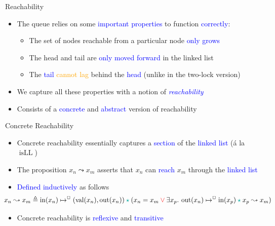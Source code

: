 \documentclass[9pt,xcolor={dvipsnames}]{beamer}
\newcommand{\isLL}{\operatorname{isLL}}
\newcommand{\nIn}[1]{\operatorname{in}(#1)}
\newcommand{\nVal}[1]{\operatorname{val}(#1)}
\newcommand{\nOut}[1]{\operatorname{out}(#1)}
\newcommand{\node}{x}
\newcommand{\nodeM}[1]{\node_{#1}}
\newcommand{\isNode}[1]{\nIn{#1} \mapsto^{\persistently} (\nVal{#1}, \nOut{#1})}
\newcommand{\reach}[2]{#1 \leadsto #2}
\let\oldlor\lor
\renewcommand{\lor}{\begingroup \color{red} \oldlor \endgroup}
\let\oldstar\star
\renewcommand{\star}{\begingroup \color{Emerald} \oldstar \endgroup}
\begin{document}
\begin{frame}{Reachability}
  \begin{itemize}
    \item The queue relies on some \textcolor{blue}{important properties} to function \textcolor{blue}{correctly}:
      \begin{itemize}
        \item The set of nodes reachable from a particular node \textcolor{blue}{only grows}
        \item The head and tail are \textcolor{blue}{only moved forward} in the linked list
        \item The \textcolor{blue}{tail} \textcolor{orange}{cannot lag} behind the \textcolor{blue}{head} (unlike in the two-lock version)
      \end{itemize}
    \item We capture all these properties with a notion of \textcolor{blue}{\textit{reachability}}
    \item Consists of a \textcolor{blue}{concrete} and \textcolor{blue}{abstract} version of reachability
  \end{itemize}
  \begin{block}{Concrete Reachability}
    \begin{itemize}
      \item Concrete reachability essentially captures a \textcolor{blue}{section} of the \textcolor{blue}{linked list} (á la $\isLL$)
      \item The proposition $\reach{\nodeM{n}}{\nodeM{m}}$ asserts that $\nodeM{n}$ can \textcolor{blue}{reach} $\nodeM{m}$ through the \textcolor{blue}{linked list}
      \item \textcolor{blue}{Defined inductively} as follows
    \begin{equation*}
      \hspace{-2em}\reach{\nodeM{n}}{\nodeM{m}} \eqdef \isNode{\nodeM{n}} \star{} (\nodeM{n} = \nodeM{m} \lor{} \Exists \nodeM{p} . \nOut{\nodeM{n}} \mapsto^{\persistently} \nIn{\nodeM{p}} \star{} \reach{\nodeM{p}}{\nodeM{m}})
    \end{equation*}
      \item Concrete reachability is \textcolor{blue}{reflexive} and \textcolor{blue}{transitive}
    \end{itemize}
  \end{block}
\end{frame}
\end{document}
